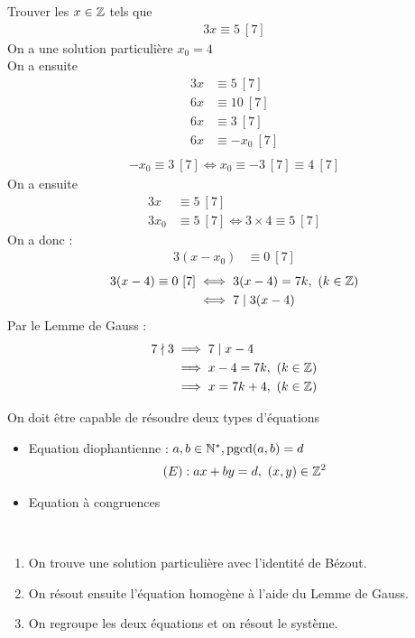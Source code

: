 \begin{exemple}
Trouver les $x \in \mathbb{Z}$ tels que 
\begin{align*}
3x \equiv 5 \ [7]
\end{align*}
On a une solution particulière $x_0 = 4$
\\
On a ensuite
\begin{align*}
3x &\equiv 5 \ [7] \\
6x &\equiv 10 \ [7] \\
6x &\equiv 3 \ [7] \\
6x &\equiv -x_0 \ [7] \\
\end{align*}
\begin{align*}
-x_0 \equiv 3 \ [7] \iff x_0 \equiv -3 \ [7] \equiv 4 \ [7]
\end{align*}
On a ensuite 
\begin{align*}
3x &\equiv 5 \ [7] \\
3x_0 &\equiv 5 \ [7] \iff 3 \times 4 \equiv 5 \ [7]
\end{align*}
On a donc :
\begin{align*}
3(x - x_0) &\equiv 0 \ [7] 
\end{align*}
\begin{align*}
3(x - 4) \equiv 0 \ [7] &\iff 3(x - 4) = 7k,\ (k \in \mathbb{Z}) \\
						&\iff 7 \mid 3(x - 4) \\
\end{align*}
Par le Lemme de Gauss :
\begin{align*}
7 \nmid 3 &\implies 7 \mid x - 4 \\
		  &\implies x - 4 = 7k,\ (k \in \mathbb{Z}) \\
		  &\implies x = 7k + 4,\ (k \in \mathbb{Z})
\end{align*}
\end{exemple}
On doit être capable de résoudre deux types d'équations
\begin{itemize}
    \item Equation diophantienne : $a, b \in \mathbb{N}^*, \mathrm{pgcd}(a, b) = d$
        \begin{align*}
            (E) : ax + by = d,\ (x, y) \in \mathbb{Z}^2
        \end{align*}
    \item Equation à congruences
\end{itemize}

\begin{remarque}~
    \begin{enumerate}
        \item On trouve une solution particulière avec l'identité de Bézout.
        \item On résout ensuite l'équation homogène à l'aide du Lemme de Gauss.
        \item On regroupe les deux équations et on résout le système.
    \end{enumerate}
\end{remarque}

